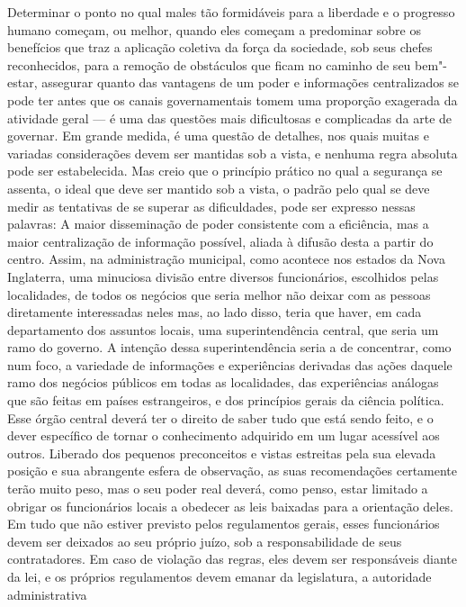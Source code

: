 Determinar o ponto no qual males tão formidáveis para a liberdade e o
progresso humano começam, ou melhor, quando eles começam a predominar
sobre os benefícios que traz a aplicação coletiva da força da
sociedade, sob seus chefes reconhecidos, para a remoção de obstáculos
que ficam no caminho de seu bem"-estar, assegurar quanto das vantagens
de um poder e informações centralizados se pode ter antes que os
canais governamentais tomem uma proporção exagerada da atividade
geral --- é uma das questões mais dificultosas e complicadas da arte de
governar. Em grande medida, é uma questão de detalhes, nos quais muitas
e variadas considerações devem ser mantidas sob a vista, e nenhuma
regra absoluta pode ser estabelecida. Mas creio que o princípio prático
no qual a segurança se assenta, o ideal que deve ser mantido sob a
vista, o padrão pelo qual se deve medir as tentativas de se superar as
dificuldades, pode ser expresso nessas palavras: A maior disseminação
de poder consistente com a eficiência, mas a maior centralização de
informação possível, aliada à difusão desta a partir do centro. Assim,
na administração municipal, como acontece nos estados da Nova
Inglaterra, uma minuciosa divisão entre diversos funcionários,
escolhidos pelas localidades, de todos os negócios que seria melhor não
deixar com as pessoas diretamente interessadas neles mas, ao lado
disso, teria que haver, em cada departamento dos assuntos locais, uma
\mbox{superintendência} central, que seria um ramo do governo. A intenção
dessa superintendência seria a de concentrar, como num foco, a
variedade de informações e experiências derivadas das ações daquele
ramo dos negócios públicos em todas as localidades, das experiências
análogas que são feitas em países estrangeiros, e dos princípios gerais
da ciência política. Esse órgão central deverá ter o direito de saber
tudo que está sendo feito, e o dever específico de tornar o
conhecimento adquirido em um lugar acessível aos outros. Liberado dos
pequenos preconceitos e vistas estreitas pela sua elevada posição e sua
abrangente esfera de observação, as suas recomendações certamente terão
muito peso, mas o seu poder real deverá, como penso, estar limitado a
obrigar os funcionários locais a obedecer as leis baixadas para a
orientação deles. Em tudo que não estiver previsto pelos regulamentos
gerais, esses funcionários devem ser deixados ao seu próprio juízo,
sob a responsabilidade de seus contratadores. Em caso de violação das
regras, eles devem ser responsáveis diante da lei, e os próprios
regulamentos devem emanar da legislatura, a autoridade administrativa
